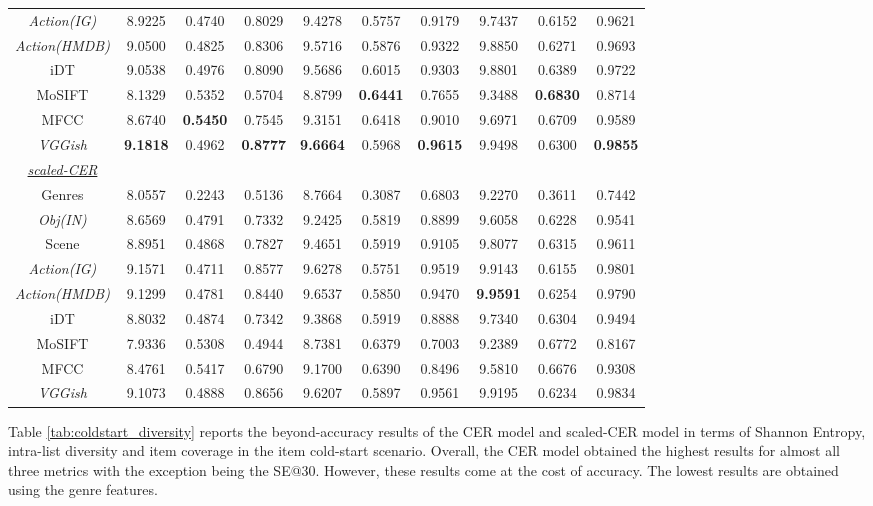 \documentclass[review]{elsarticle}
\begin{document}
\begin{table}[H]
\begin{adjustbox}{width=\columnwidth}
\begin{tabular}{|c|c c c c c c c c c|}
\textit{Action(IG)} 	&8.9225	&0.4740	&0.8029	&9.4278	&0.5757	&0.9179	&9.7437	&0.6152	&0.9621	\\ 
\textit{Action(HMDB)}	&9.0500	&0.4825	&0.8306	&9.5716	&0.5876	&0.9322	&9.8850	&0.6271	&0.9693	\\ 
iDT 	&9.0538	&0.4976	&0.8090	&9.5686	&0.6015	&0.9303	&9.8801	&0.6389	&0.9722	\\ 
MoSIFT	&8.1329	&0.5352	&0.5704	&8.8799	&\textbf{0.6441}	&0.7655	&9.3488	&\textbf{0.6830}	&0.8714	\\ 
MFCC	&8.6740	&\textbf{0.5450}	&0.7545	&9.3151	&0.6418	&0.9010	&9.6971	&0.6709	&0.9589	\\ 
\textit{VGGish} 	&\textbf{9.1818}	&0.4962	&\textbf{0.8777}	&\textbf{9.6664}	&0.5968	&\textbf{0.9615}	&9.9498	&0.6300	&\textbf{0.9855}	\\ 
\midrule
\underline{\textit{scaled-CER}} & & & & & & & & &\\
Genres 	&8.0557	&0.2243	&0.5136	&8.7664	&0.3087	&0.6803	&9.2270	&0.3611	&0.7442	\\ 
\textit{Obj(IN)} 	&8.6569	&0.4791	&0.7332	&9.2425	&0.5819	&0.8899	&9.6058	&0.6228	&0.9541	\\
Scene 	&8.8951	&0.4868	&0.7827	&9.4651	&0.5919	&0.9105	&9.8077	&0.6315	&0.9611	\\ 
\textit{Action(IG)} 	&9.1571	&0.4711	&0.8577	&9.6278	&0.5751	&0.9519	&9.9143	&0.6155	&0.9801	\\ 
\textit{Action(HMDB)} 	&9.1299	&0.4781	&0.8440	&9.6537	&0.5850	&0.9470	&\textbf{9.9591}	&0.6254	&0.9790	\\ 
iDT 	&8.8032	&0.4874	&0.7342	&9.3868	&0.5919	&0.8888	&9.7340	&0.6304	&0.9494	\\ 
MoSIFT 	&7.9336	&0.5308	&0.4944	&8.7381	&0.6379	&0.7003	&9.2389	&0.6772	&0.8167	\\ 
MFCC 	&8.4761	&0.5417	&0.6790	&9.1700	&0.6390	&0.8496	&9.5810	&0.6676	&0.9308	\\ 
\textit{VGGish} 	&9.1073	&0.4888	&0.8656	&9.6207	&0.5897	&0.9561	&9.9195	&0.6234	&0.9834	\\ \hline
    \end{tabular}
    \end{adjustbox}
\end{table}

Table \ref{tab:coldstart_diversity} reports the beyond-accuracy results of the CER model and scaled-CER model in terms of Shannon Entropy, intra-list diversity and item coverage in the item cold-start scenario. Overall, the CER model obtained the highest results for almost all three metrics with the exception being the SE@30. However, these results come at the cost of accuracy. The lowest results are obtained using the genre features. 
\end{document}
